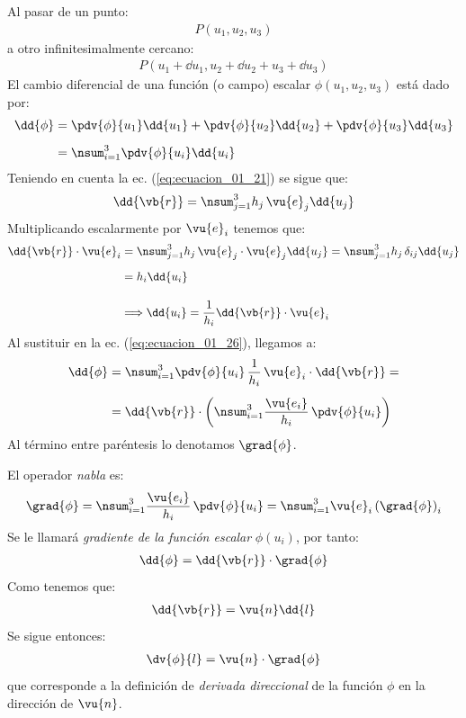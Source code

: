 Al pasar de un punto:
\begin{align*}
P(u_{1}, u_{2}, u_{3})
\end{align*}
a otro infinitesimalmente cercano:
\begin{align*}
P(u_{1} + \dd{u}_{1}, u_{2} + \dd{u_{2}} + u_{3} + \dd{u_{3}})
\end{align*}
El cambio diferencial de una función (o campo) escalar $\phi(u_{1}, u_{2}, u_{3})$ está dado por:
\begin{align}
\begin{aligned}
\dd{\phi} &= \pdv{\phi}{u_{1}} \dd{u_{1}} + \pdv{\phi}{u_{2}} \dd{u_{2}} + \pdv{\phi}{u_{3}} \dd{u_{3}} \\[0.5em]
&= \nsum_{i=1}^{3} \pdv{\phi}{u_{i}} \dd{u_{i}}
\end{aligned}
\label{eq:ecuacion_01_26}
\end{align}
Teniendo en cuenta la ec. (\ref{eq:ecuacion_01_21}) se sigue que:
\begin{align}
\dd{\vb{r}} = \nsum_{j=1}^{3} h_{j} \, \vu{e}_{j} \dd{u_{j}}
\label{eq:ecuacion_01_27}
\end{align}
Multiplicando escalarmente por $\vu{e}_{i}$ tenemos que:
\begin{align*}
\dd{\vb{r}} \cdot \vu{e}_{i} &= \nsum_{j=1}^{3} h_{j} \, \vu{e}_{j} \cdot \vu{e}_{j} \dd{u_{j}} = \nsum_{j=1}^{3} h_{j} \, \delta_{ij} \dd{u_{j}} \\[0.5em]
&= h_{i} \dd{u_{i}} \\[1em]
&\Longrightarrow \dd{u_{i}} = \dfrac{1}{h_{i}} \dd{\vb{r}} \cdot \vu{e}_{i}
\end{align*}
Al sustituir en la ec. (\ref{eq:ecuacion_01_26}), llegamos a:
\begin{align*}
\dd{\phi} &= \nsum_{i=1}^{3} \pdv{\phi}{u_{i}} \, \dfrac{1}{h_{i}} \, \vu{e}_{i} \cdot \dd{\vb{r}} = \\[0.5em]
&= \dd{\vb{r}} \cdot \left( \nsum_{i=1}^{3} \dfrac{\vu{e_{i}}}{h_{i}} \, \pdv{\phi}{u_{i}} \right)
\end{align*}
Al término entre paréntesis lo denotamos $\grad{\phi}$.
\par
El operador \emph{nabla} es:
\begin{align}
\grad{\phi} = \nsum_{i=1}^{3} \dfrac{\vu{e_{i}}}{h_{i}} \, \pdv{\phi}{u_{i}} = \nsum_{i=1}^{3} \vu{e}_{i} \left( \grad{\phi} \right)_{i}
\label{eq:ecuacion_01_28}
\end{align}
Se le llamará \emph{gradiente de la función escalar} $\phi(u_{i})$, por tanto:
\begin{align}
\dd{\phi} = \dd{\vb{r}} \cdot \grad{\phi}
\label{eq:ecuacion_01_29}
\end{align}
Como tenemos que:
\begin{align*}
\dd{\vb{r}} = \vu{n} \dd{l}
\end{align*}
Se sigue entonces:
\begin{align*}
\dv{\phi}{l} = \vu{n} \cdot \grad{\phi}
\end{align*}
que corresponde a la definición de \emph{derivada direccional} de la función $\phi$ en la dirección de $\vu{n}$.

